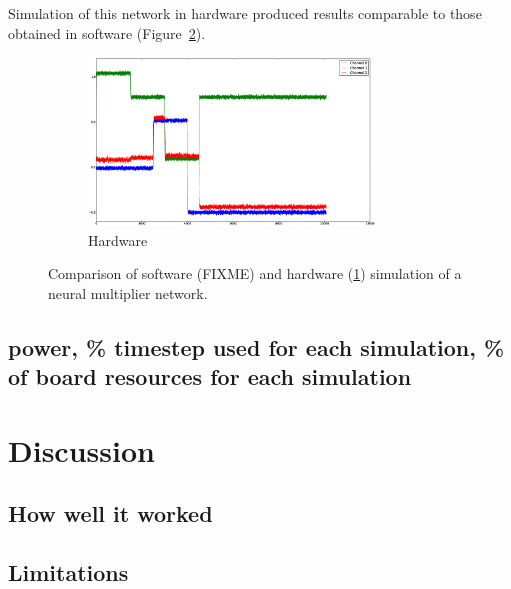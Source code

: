 \documentclass[english]{article}
\begin{document}

Simulation of this network in hardware produced results comparable to those obtained in software
(Figure~\ref{fig:multiplier}).

\begin{figure}
\centering


\begin{subfigure}[b]{0.5\textwidth}
\centering
\includegraphics[width=3in]{multiplier.eps}
\caption{Hardware}
\label{fig:multiplier:hw}
\end{subfigure}

\caption[Multiplier simulation comparison.]
{Comparison of software (FIXME) and hardware (\ref{fig:multiplier:hw})
simulation of a neural multiplier network.}
\label{fig:multiplier}
\end{figure}

\subsection{power, \% timestep used for each simulation, \% of board resources for each simulation}

\section{Discussion}

\subsection{How well it worked}

\subsection{Limitations}

\end{document}
